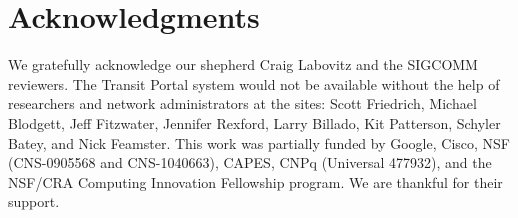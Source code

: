 
\section*{Acknowledgments}
We gratefully acknowledge our shepherd Craig Labovitz and the
SIGCOMM reviewers. The Transit Portal system would not be available without the help of researchers and network administrators at
the sites: Scott Friedrich, Michael Blodgett, Jeff Fitzwater, Jennifer Rexford, Larry Billado, Kit Patterson, Schyler Batey, and Nick Feamster.
This work was partially funded by Google, Cisco, NSF (CNS-0905568 and
CNS-1040663), CAPES, CNPq (Universal 477932), and the NSF/CRA Computing Innovation Fellowship program. We are thankful for their support.
